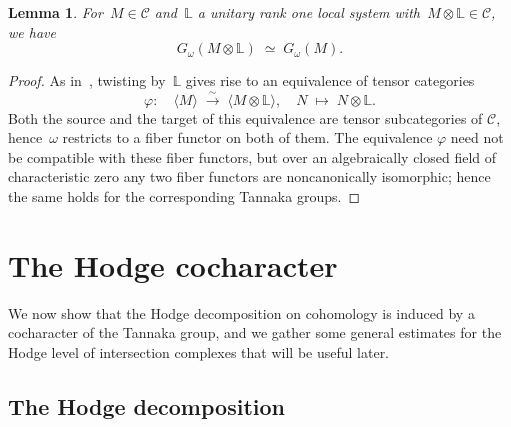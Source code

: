 \documentclass[a4paper]{amsart}
\newcommand{\bbL}{\mathbb{L}}
\newcommand{\cC}{\mathcal{C}}
\newcommand{\too}{\longrightarrow}
\theoremstyle{plain}
\newtheorem{lemma}[theorem]{Lemma}
\theoremstyle{definition}
\numberwithin{equation}{section}
\begin{document}
\begin{lemma} \label{lem:tannakagroup-of-twist}
	For~$M\in \cC$ and~$\bbL$ a unitary rank one local system with~$M\otimes \bbL\in \cC$, we have
	\[
	G_\omega(M\otimes \bbL) \;\simeq \; G_\omega(M).
	\] 
\end{lemma} 

\begin{proof} 
	As in~\cite[prop.~4.1]{KWVanishing}, twisting by~$\bbL$ gives rise to an equivalence of tensor categories
	\[
	\varphi\colon \quad \langle M \rangle \;\stackrel{\sim}{\too} \; \langle M\otimes \bbL \rangle, \quad N \;\longmapsto\; N\otimes \bbL.
	\]
Both the source and the target of this equivalence are tensor subcategories of $\cC$, hence~$\omega$ restricts to a fiber functor on both of them. The equivalence $\varphi$ need not be compatible with these fiber functors, but over an algebraically closed field of characteristic zero any two fiber functors are noncanonically isomorphic; hence the same holds for the corresponding Tannaka groups. 
\end{proof} 

\section{The Hodge cocharacter}

We now show that the Hodge decomposition on cohomology is induced by a cocharacter of the Tannaka group, and we gather some general estimates for the Hodge level of intersection complexes that will be useful later.

\subsection{The Hodge decomposition} \label{subsec:hodge-decomposition}
\end{document}
